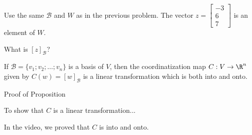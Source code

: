 
\endedxproblem



Use the same $\mathcal{B}$ and $W$ as in the previous problem.  The vector 
$z = \left[\begin{array}{c} -3 \\ 6  \\ 7 \end{array} \right]$ is an element of $W$.  

What is $[z]_{\mathcal{B}}$?






\endedxproblem


\endedxvertical










{}  If $\mathcal{B}  = \{v_1; v_2; \ldots ; v_n\}$ is a basis of $V$, then the
coordinatization map $C: V \rightarrow \R^n$ given by $C(w) = [w]_{\mathcal{B}}$ is a linear transformation
which is both into and onto.

\begin{edXshowhide}{Proof of Proposition}

To show that $C$ is a linear transformation...

In the video, we proved that $C$ is into and onto. 

\end{edXshowhide}




